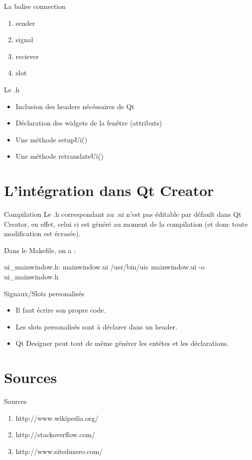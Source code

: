 \documentclass{beamer}
\begin{document}
\begin {frame}[fragile]{La balise connection}
 \begin{enumerate}
  \item sender
  \item signal
  \item reciever
  \item slot
 \end{enumerate}
\end{frame}

\begin {frame}[fragile]{Le .h}
 \begin{itemize} [<+-|alert@+>]
  \item Inclusion des headers nécéssaires de Qt
  \item Déclaration des widgets de la fenêtre (attributs)
  \item Une méthode setupUi()
  \item Une méthode retranslateUi()
 \end{itemize}
\end{frame}

\section{L'intégration dans Qt Creator}
 \begin {frame}{Compilation} 
Le .h correspondant au .ui n'est pas éditable par défault dans Qt Creator, en effet, celui ci est généré au moment de la compilation (et donc toute modification est écrasée).\newline \newline

Dans le Makefile, on a :\newline \newline

ui\_mainwindow.h: mainwindow.ui\newline
/usr/bin/uic mainwindow.ui -o ui\_mainwindow.h
\end {frame}

\begin {frame}[fragile]{Signaux/Slots personalisés}
 \begin{itemize} [<+-|alert@+>]
  \item Il faut écrire son propre code.
  \item Les slots personalisés sont à déclarer dans un header.
  \item Qt Designer peut tout de même générer les entêtes et les déclarations.
 \end{itemize}
\end{frame}

\section{Sources}
\begin {frame}[fragile]{Sources}
 \begin{enumerate}
  \item http://www.wikipedia.org/
  \item http://stackoverflow.com/
  \item http://www.siteduzero.com/
 \end{enumerate}
\end{frame}
\end{document}
